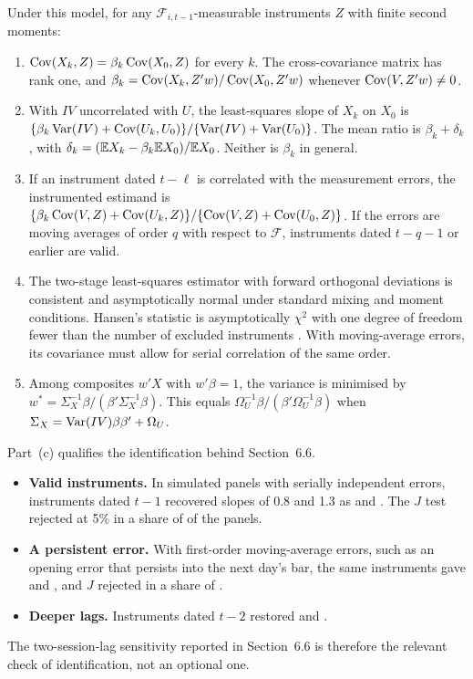 \begin{proposition}\label{prop:iv}
Under this model, for any $\mathcal F_{i,t-1}$-measurable instruments $Z$ with finite second
moments:
\begin{enumerate}[label=(\alph*)]
  \item $\operatorname{Cov}(X_k,Z)=\beta_k\operatorname{Cov}(X_0,Z)$ for every $k$. The cross-covariance matrix has rank one,
        and $\beta_k=\operatorname{Cov}(X_k,Z'w)/\operatorname{Cov}(X_0,Z'w)$ whenever $\operatorname{Cov}(V,Z'w)\neq0$.
  \item With $IV$ uncorrelated with $U$, the least-squares slope of $X_k$ on $X_0$ is
        $\{\beta_k\operatorname{Var}(IV)+\operatorname{Cov}(U_k,U_0)\}/\{\operatorname{Var}(IV)+\operatorname{Var}(U_0)\}$. The mean ratio is
        $\beta_k+\delta_k$, with $\delta_k=(\mathbb{E} X_k-\beta_k\mathbb{E} X_0)/\mathbb{E} X_0$. Neither is $\beta_k$ in
        general.
  \item If an instrument dated $t-\ell$ is correlated with the measurement errors, the
        instrumented estimand is
        $\{\beta_k\operatorname{Cov}(V,Z)+\operatorname{Cov}(U_k,Z)\}/\{\operatorname{Cov}(V,Z)+\operatorname{Cov}(U_0,Z)\}$. If the errors are moving
        averages of order $q$ with respect to $\mathcal F$, instruments dated $t-q-1$ or earlier
        are valid.
  \item The two-stage least-squares estimator with forward orthogonal deviations is consistent and
        asymptotically normal under standard mixing and moment conditions. Hansen's statistic
        is asymptotically $\chi^2$ with one degree of freedom fewer than the number of excluded
        instruments \citep{Hansen1982,ArellanoBover1995}. With moving-average errors, its
        covariance must allow for serial correlation of the same order.
  \item Among composites $w'X$ with $w'\beta=1$, the variance is minimised by
        $w^*=\Sigma_X^{-1}\beta/(\beta'\Sigma_X^{-1}\beta)$. This equals
        $\Omega_U^{-1}\beta/(\beta'\Omega_U^{-1}\beta)$ when $\Sigma_X=\operatorname{Var}(IV)\beta\beta'+\Omega_U$.
\end{enumerate}
\end{proposition}

Part~(c) qualifies the identification behind Section~6.6.
\begin{itemize}
  \item \textbf{Valid instruments.} In  simulated panels with serially independent
        errors, instruments dated $t-1$ recovered slopes of 0.8 and 1.3 as  and
        . The $J$ test rejected at 5\% in a share of  of the panels.
  \item \textbf{A persistent error.} With first-order moving-average errors, such as an opening
        error that persists into the next day's bar, the same instruments gave 
        and , and $J$ rejected in a share of .
  \item \textbf{Deeper lags.} Instruments dated $t-2$ restored  and
        .
\end{itemize}
The two-session-lag sensitivity reported in Section~6.6 is therefore the relevant check of
identification, not an optional one.

